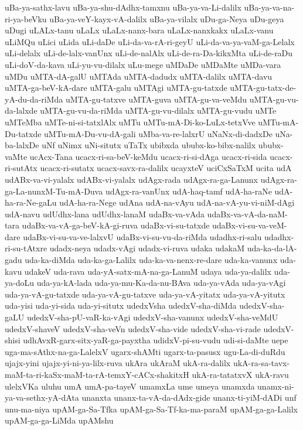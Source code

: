 {uBa-ya-sathx-lavu
uBa-ya-shu-dAdhx-tamxnu
uBa-ya-va-Li-dalilx
uBa-ya-va-na-ri-ya-beVku
uBa-ya-veY-kayx-vA-dalilx
uBa-ya-vilalx
uDu-ga-Neya
uDu-geya
uDugi
uLALx-tanu
uLaLx
uLaLx-nanx-bara
uLaLx-nanxkakx
uLaLx-vanu
uLiMQu
uLici
uLida
uLi-daDe
uLi-da-va-rA-ri-geyU
uLi-da-va-ya-vaM-ga-Lelalx
uLi-delalx
uLi-de-lalx-vanUnx
uLi-de-nalAlx
uLi-de-ra-Da-kikxMta
uLi-de-raDu
uLi-doV-da-kava
uLi-yu-vu-dilalx
uLu-mege
uMDaDe
uMDaMte
uMDa-vara
uMDu
uMTA-dA-galU
uMTAda
uMTA-dadudx
uMTA-dalilx
uMTA-davu
uMTA-ga-beV-kA-dare
uMTA-galu
uMTAgi
uMTA-gu-tatxde
uMTA-gu-tatx-de-yA-du-da-riMda
uMTA-gu-tatxve
uMTA-guva
uMTA-gu-va-veMdu
uMTA-gu-vu-da-lalxde
uMTA-gu-vu-da-riMda
uMTA-gu-vu-dilalx
uMTA-gu-vudu
uMTe
uMTeMba
uMTe-ni-si-tatxlAlx
uMTu
uMTu-mA-Di-ko-LuLx-tetxVve
uMTu-mA-Du-tatxde
uMTu-mA-Du-vu-dA-gali
uMba-va-re-lalxrU
uNaNx-di-dadxDe
uNa-ba-lalxDe
uNf
uNimx
uNi-situtx
uTaTx
ubibxda
ububx-ko-bibx-nalilx
ububx-vaMte
ucAcx-Tana
ucacx-ri-sa-beV-keMdu
ucacx-ri-si-dAga
ucacx-ri-sida
ucacx-ri-sutAtx
ucacx-ri-sutatx
ucacx-savx-ra-dalilx
ucayxteV
uciCxSaTxM
ucita
udA
udABx-va-vi-yalalx
udABx-vi-yalalx
udAgx-rada
udAgx-ra-ga-Lanunx
udAgx-ra-ga-La-nunxM-Tu-mA-Duva
udAgx-ra-vanUnx
udA-haq-tamf
udA-ha-raNe
udA-ha-ra-Ne-gaLu
udA-ha-ra-Nege
udAna
udA-na-vAyu
udA-na-vA-yu-vi-niM-dAgi
udA-navu
udUdhx-lana
udUdhx-lanaM
udaBx-va-vAda
udaBx-va-vA-da-naM-tara
udaBx-va-vA-ga-beV-kA-gi-ruva
udaBx-vi-su-tatxde
udaBx-vi-su-va-veM-dare
udaBx-vi-su-va-ve-lalxvU
udaBx-vi-su-vu-da-riMda
udadhx-ri-salu
udadhx-ri-su-tAtxre
udadx-neya
udadx-vAgi
udadx-vi-ruva
udaka
udakaM
uda-ka-da-lA-gadu
uda-ka-diMda
uda-ka-ga-Lalilx
uda-ka-va-nenx-re-dare
uda-ka-vanunx
uda-kavu
udakeV
uda-rava
uda-yA-satx-mA-na-ga-LanuM
udaya
uda-ya-dalilx
uda-ya-doLu
uda-ya-kA-lada
uda-ya-mu-Ka-da-nu-BAva
uda-ya-vAda
uda-ya-vAgi
uda-ya-vA-gu-tatxde
uda-ya-vA-gu-tatxve
uda-ya-vA-yitatx
uda-ya-vA-yitutx
uda-yisi
uda-yi-sida
uda-yi-situtx
udedxVsha
udedxV-sha-diMda
udedxV-sha-gaLU
udedxV-sha-pU-vaR-ka-vAgi
udedxV-sha-vanunx
udedxV-sha-veMdU
udedxV-shaveV
udedxV-sha-veVn
udedxV-sha-vide
udedxV-sha-vi-rade
udedxV-shisi
udhAvxR-garx-sitx-yaR-ga-payxtha
udidxV-pi-su-vudu
udi-si-daMte
uepe
uga-ma-sAthx-na-ga-LalelxV
ugarx-shAMti
ugarx-ta-pasusx
ugu-La-di-duRdu
ujajx-yini
ujajx-yi-ni-ya-lilx-ruva
ukAra
ukAraM
ukA-ra-dalilx
ukA-ra-sa-tavx-maM-ta-ri-kaSx-maM-ta-rA-temxY-cACx-shakitxH
ukA-ra-tatatxvX
ukA-ravu
ulelxVKa
uluhu
umA
umA-pa-tayeV
umamxLa
ume
umeya
unamxda
unamx-ni-ya-va-sethx-yA-dAta
unanxta
unanx-ta-vA-da-dAdx-gide
unanx-ti-yiM-dADi
unf
unu-ma-niya
upAM-ga-Sa-Tfka
upAM-ga-Sa-Tf-ka-ma-paraM
upAM-ga-ga-Lalilx
upAM-ga-ga-LiMda
upAMshu
}
